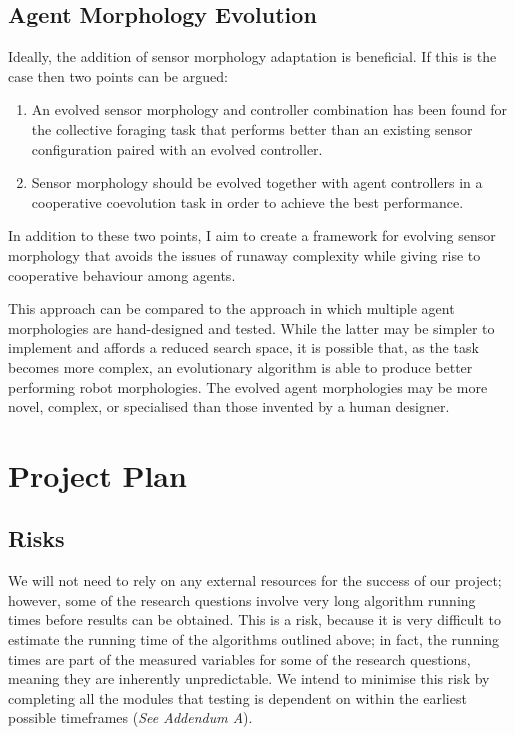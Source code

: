 \documentclass[a4paper,12pt]{article}
\begin{document}
\subsection{Agent Morphology Evolution}
Ideally, the addition of sensor morphology adaptation is beneficial. If this is the case then two points can be argued:
\begin{enumerate}
\item An evolved sensor morphology and controller combination has been found for the collective foraging task that performs better than an existing sensor configuration paired with an evolved controller.
\item Sensor morphology should be evolved together with agent controllers in a cooperative coevolution task in order to achieve the best performance.
\end{enumerate}

In addition to these two points, I aim to create a framework for evolving sensor morphology that avoids the issues of runaway complexity while giving rise to cooperative behaviour among agents.

This approach can be compared to the approach in which multiple agent morphologies are hand-designed and tested. While the latter may be simpler to implement and affords a reduced search space, it is possible that, as the task becomes more complex, an evolutionary algorithm is able to produce better performing robot morphologies. The evolved agent morphologies may be more novel, complex, or specialised than those invented by a human designer.

\section{Project Plan}

\subsection{Risks}
We will not need to rely on any external resources for the success of our project; however, some of the research questions involve very long algorithm running times before results can be obtained. This is a risk, because it is very difficult to estimate the running time of the algorithms outlined above; in fact, the running times are part of the measured variables for some of the research questions, meaning they are inherently unpredictable. We intend to minimise this risk by completing all the modules that testing is dependent on within the earliest possible timeframes (\textit{See Addendum A}).
\end{document}
